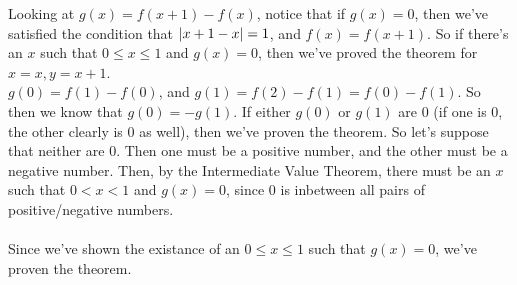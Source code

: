 \begin{enumerate}
    Looking at $g(x) = f(x+1) - f(x)$, notice that if $g(x) = 0$, then we've satisfied the condition that $\left\vert x+1 - x \right\vert = 1$, and $f(x) = f(x+1)$. So if there's an $x$ such that $0 \leq x \leq 1$ and $g(x) = 0$, then we've proved the theorem for $x=x, y=x+1$.\\

    $g(0) = f(1) - f(0)$, and $g(1) = f(2) - f(1) = f(0) - f(1)$. So then we know that $g(0) = -g(1)$. If either $g(0)$ or $g(1)$ are 0 (if one is 0, the other clearly is 0 as well), then we've proven the theorem. So let's suppose that neither are 0. Then one must be a positive number, and the other must be a negative number. Then, by the Intermediate Value Theorem, there must be an $x$ such that $0 < x < 1$ and $g(x) = 0$, since $0$ is inbetween all pairs of positive/negative numbers.\\\\
    Since we've shown the existance of an $0 \leq x \leq 1$ such that $g(x) = 0$, we've proven the theorem.
\end{enumerate}


